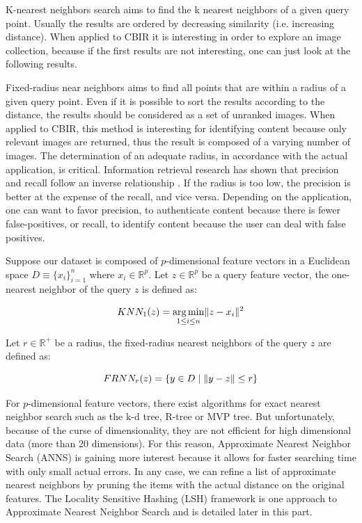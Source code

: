 K-nearest neighbors search aims to find the k nearest neighbors of a given query point. Usually the results are ordered by decreasing similarity (i.e. increasing distance). When applied to CBIR it is interesting in order to explore an image collection, because if the first results are not interesting, one can just look at the following results. 

Fixed-radius near neighbors aims to find all points that are within a radius of a given query point. Even if it is possible to sort the results according to the distance, the results should be considered as a set of unranked images. When applied to CBIR, this method is interesting for identifying content because only relevant images are returned, thus the result is composed of a varying number of images. The determination of an adequate radius, in accordance with the actual application, is critical. Information retrieval research has shown that precision and recall follow an inverse relationship \cite{datta2008image}. If the radius is too low, the precision is better at the expense of the recall, and vice versa. Depending on the application, one can want to favor precision, to authenticate content because there is fewer false-positives, or recall, to identify content because the user can deal with false positives.

Suppose our dataset is composed of $p$-dimensional feature vectors in a Euclidean space $D\equiv{\{x_i\}}_{i=1}^{n}$ where $x_i\in\mathbb{R}^{p}$. Let $z\in\mathbb{R}^{p}$ be a query feature vector, the one-nearest neighbor of the query $z$ is defined as:

\[KNN_{1}(z)=\operatorname*{arg\,min}_{1 \leq i \leq n} \lVert z-x_i\rVert^2\]

Let $r\in\mathbb{R}^+$ be a radius, the fixed-radius nearest neighbors of the query $z$ are defined as:

\[FRNN_{r}(z)=\{y \in D \;|\; \lVert y - z\rVert \leq r\}\]

For $p$-dimensional feature vectors, there exist algorithms for exact nearest neighbor search such as the k-d tree, R-tree or MVP tree. But unfortunately, because of the curse of dimensionality, they are not efficient for high dimensional data (more than 20 dimensions). For this reason, Approximate Nearest Neighbor Search (ANNS) is gaining more interest because it allows for faster searching time with only small actual errors. In any case, we can refine a list of approximate nearest neighbors by pruning the items with the actual distance on the original features. The Locality Sensitive Hashing (LSH) framework is one approach to Approximate Nearest Neighbor Search and is detailed later in this part.